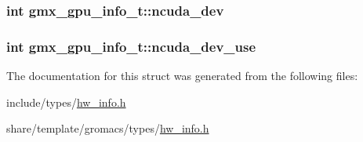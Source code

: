 \hypertarget{structgmx__gpu__info__t_af205c89754844a12a42aa689765276cf}{
\subsubsection[{ncuda\-\_\-dev}]{\setlength{\rightskip}{0pt plus 5cm}int {\bf gmx\-\_\-gpu\-\_\-info\-\_\-t\-::ncuda\-\_\-dev}}}\label{structgmx__gpu__info__t_af205c89754844a12a42aa689765276cf}
\hypertarget{structgmx__gpu__info__t_aece31d9c0b161fa463fb62dc814dd416}{
\subsubsection[{ncuda\-\_\-dev\-\_\-use}]{\setlength{\rightskip}{0pt plus 5cm}int {\bf gmx\-\_\-gpu\-\_\-info\-\_\-t\-::ncuda\-\_\-dev\-\_\-use}}}\label{structgmx__gpu__info__t_aece31d9c0b161fa463fb62dc814dd416}


\-The documentation for this struct was generated from the following files\-:\begin{DoxyCompactItemize}
\item 
include/types/\hyperlink{include_2types_2hw__info_8h}{hw\-\_\-info.\-h}\item 
share/template/gromacs/types/\hyperlink{share_2template_2gromacs_2types_2hw__info_8h}{hw\-\_\-info.\-h}\end{DoxyCompactItemize}
